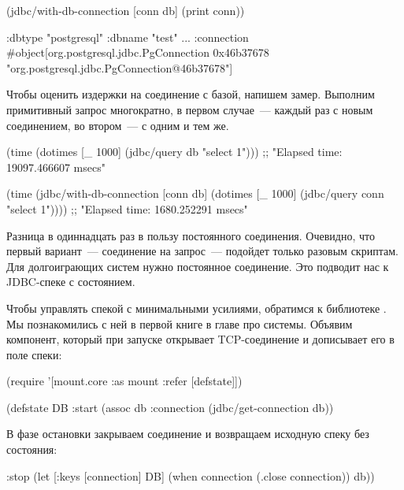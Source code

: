 \begin{english}
  \begin{clojure}
(jdbc/with-db-connection [conn db]
  (print conn))

{:dbtype "postgresql"
 :dbname "test"
 ...
 :connection #object[org.postgresql.jdbc.PgConnection 0x46b37678 "org.postgresql.jdbc.PgConnection@46b37678"]}
  \end{clojure}
\end{english}

Чтобы оценить издержки на соединение с базой, напишем замер. Выполним примитивный запрос многократно, в первом случае~--- каждый раз с новым соединением, во втором~--- с одним и тем же.

\begin{english}
  \begin{clojure}
(time (dotimes [_ 1000]
        (jdbc/query db "select 1")))
;; "Elapsed time: 19097.466607 msecs"

(time
 (jdbc/with-db-connection [conn db]
   (dotimes [_ 1000]
     (jdbc/query conn "select 1"))))
;; "Elapsed time: 1680.252291 msecs"
  \end{clojure}
\end{english}

Разница в одиннадцать раз в пользу постоянного соединения. Очевидно, что первый вариант~--- соединение на запрос~--- подойдет только разовым скриптам. Для долгоиграющих систем нужно постоянное соединение. Это подводит нас к JDBC-спеке с состоянием.

Чтобы управлять спекой с минимальными усилиями, обратимся к библиотеке . Мы познакомились с ней в первой книге в главе про системы. Объявим компонент, который при запуске открывает TCP-соединение и дописывает его в поле  спеки:

\begin{english}
  \begin{clojure}
(require '[mount.core :as mount :refer [defstate]])

(defstate DB
  :start
  (assoc db :connection
         (jdbc/get-connection db))
  \end{clojure}
\end{english}

В фазе остановки закрываем соединение и возвращаем исходную спеку без состояния:

\begin{english}
  \begin{clojure}
  :stop
  (let [{:keys [connection]} DB]
    (when connection
      (.close connection))
    db))
  \end{clojure}
\end{english}

